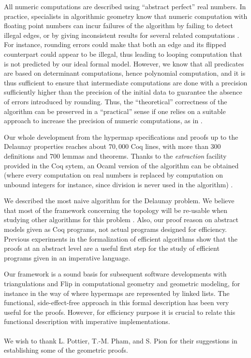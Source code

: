 \documentclass{llncs}
\begin{document}
All numeric computations are described using ``abstract perfect'' real
numbers.  In practice, specialists in algorithmic geometry know that numeric
computation with floating point numbers can incur failures of the algorithm
by failing to detect illegal edges, or by giving inconsistent results for
several related computations \cite{yp06,ket08}.  For instance, rounding errors
could make that
both an edge and its flipped counterpart could appear to be illegal, thus
leading to looping computation that is not predicted by our ideal formal model.
However, we know that all predicates are based on determinant computations,
hence polynomial computation, and it is thus sufficient to ensure that
intermediate computations are done with a precision sufficiently higher than
the precision of the initial data to guarantee the absence of errors
introduced by rounding.  Thus, the ``theoretical'' correctness of the algorithm
can be preserved in a ``practical'' sense if one relies on a suitable
approach to increase the precision of numeric computations, as in \cite{mel:pio,pri91,Fou07}.

Our whole development from the hypermap specifications and proofs
up to the Delaunay properties reaches about $70,000$ Coq lines, with
more than $300$ definitions and $700$ lemmas and theorems.  Thanks to
the {\sl extraction} facility provided in the Coq sytem, an Ocaml version
of the algorithm can be obtained (where every computation on real numbers
is replaced by computation on unbound integers for instance, since
division is never used in the algorithm) \cite{duf:ber10}.

We described the most naive algorithm for the Delaunay problem.  We
believe that most of the framework concerning the topology will be
re-usable when studying other algorithms for this problem
\cite{gs85,ede00,deb08}.  Also, our proof reason on abstract models
given as Coq programs, not actual programs
designed for efficiency.  Previous experiments in the formalization of
efficient algorithms \cite{BMZ02} show that the proofs at an abstract level are
a useful first step for the study of efficient programs given in
an imperative language.

Our framework is a sound basis for subsequent software developments
with triangulations and Flip in computational geometry and geometric
modeling, for instance in the way of
\cite{ber:duf,duf:pui,duf07,bru:duf:mag09} where hypermaps are
represented by linked lists.  The functional, side-effect-free
approach in this formal description has been very useful for the proofs.
However, for efficiency purpose it is crucial to relate this functional description with imperative implementations.
\\ \\
  We wish to thank L. Pottier,
T.-M. Pham, and S. Pion for their suggestions in establishing some of
the geometric proofs.
\end{document}
